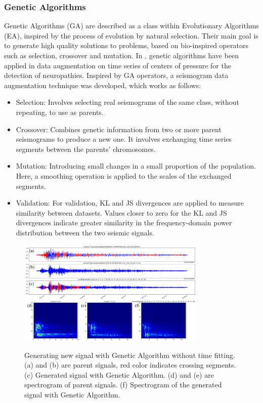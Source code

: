 \documentclass[journal]{IEEEtran}
\begin{document}
\subsubsection{Genetic Algorithms}
Genetic Algorithms (GA) are described as a class within Evolutionary Algorithms (EA), inspired by the process of evolution by natural selection. Their main goal is to generate high quality solutions to problems, based on bio-inspired operators such as selection, crossover and mutation\cite{nethravathi2017augmentation}. In \cite{villegas2024data}, genetic algorithms have been applied in data augmentation on time series of centers of pressure for the detection of neuropathies.
Inspired by GA operators, a seismogram data augmentation technique was developed, which works as follows:
\begin{itemize}
 \item Selection: Involves selecting real seismograms of the same class, without repeating, to use as parents.
 \item Crossover: Combines genetic information from two or more parent seismograms to produce a new one. It involves exchanging time series segments between the parents' chromosomes.
 \item Mutation: Introducing small changes in a small proportion of the population. Here, a smoothing operation is applied to the scales of the exchanged segments.
 \item Validation: For validation, KL and JS divergences are applied to measure similarity between datasets. Values closer to zero for the KL and JS divergences indicate greater similarity in the frequency-domain power distribution between the two seismic signals.
\end{itemize}
\begin{figure}
\centering
{\includegraphics[width=0.8\textwidth,keepaspectratio]{img/da_ag1.png}}
\caption{Generating new signal with Genetic Algorithm without time fitting. (a) and (b) are parent signals, red color indicates crossing segments. (c) Generated signal with Genetic Algorithm. (d) and (e) are spectrogram of parent signals. (f) Spectrogram of the generated signal with Genetic Algorithm.}
\label{fig:da_ga1}
\end{figure}
\end{document}
